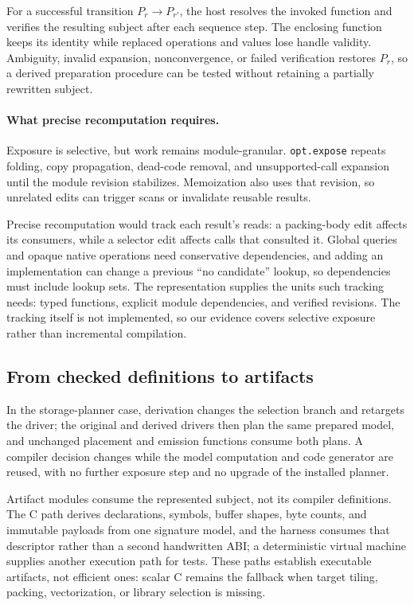 \documentclass[sigplan,anonymous,review]{acmart}
\begin{document}
For a successful transition $P_r\rightarrow P_{r'}$, the host resolves the
invoked function and verifies the resulting subject after each sequence step.
The enclosing function keeps its identity while replaced operations and
values lose handle validity. Ambiguity, invalid expansion, nonconvergence, or
failed verification restores $P_r$, so a derived preparation procedure can be
tested without retaining a partially rewritten subject.

\paragraph{What precise recomputation requires.}
Exposure is selective, but work remains module-granular. \texttt{opt.expose}
repeats folding, copy propagation, dead-code removal, and unsupported-call
expansion until the module revision stabilizes. Memoization also uses that
revision, so unrelated edits can trigger scans or invalidate reusable results.

Precise recomputation would track each result's reads: a packing-body edit
affects its consumers, while a selector edit affects calls that consulted it.
Global queries and opaque native operations need conservative dependencies,
and adding an implementation can change a previous ``no candidate'' lookup, so
dependencies must include lookup sets. The representation supplies the units
such tracking needs: typed functions, explicit module dependencies, and verified
revisions. The tracking itself is not implemented, so our evidence covers
selective exposure rather than incremental compilation.

\subsection{From checked definitions to artifacts}
In the storage-planner case, derivation changes the selection branch and
retargets the driver; the original and derived drivers then plan the same
prepared model, and unchanged placement and emission functions consume both
plans. A compiler decision changes while the model computation and code
generator are reused, with no further exposure step and no upgrade of the
installed planner.

Artifact modules consume the represented subject, not its compiler definitions.
The C path derives declarations, symbols, buffer shapes, byte counts, and
immutable payloads from one signature model, and the harness consumes that
descriptor rather than a second handwritten ABI; a deterministic virtual
machine supplies another execution path for tests. These paths establish
executable artifacts, not efficient ones: scalar C remains the fallback when
target tiling, packing, vectorization, or library selection is missing.
\end{document}
